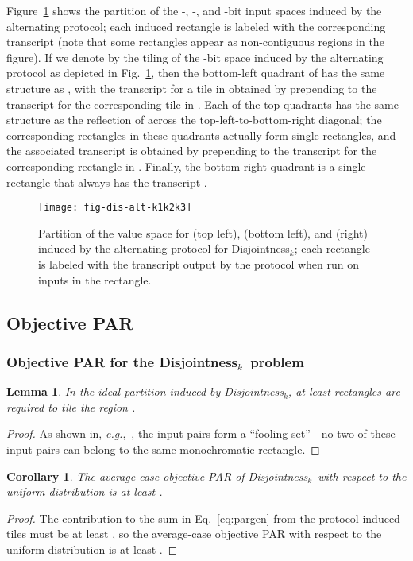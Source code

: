 \documentclass{article}
\theoremstyle{theorem}
\newtheorem{cor}[theorem]{Corollary}
\newtheorem{lemma}[theorem]{Lemma}
\theoremstyle{definition}
\theoremstyle{remark}
\newcommand{\eg}{\emph{e.g.}}
\newcommand{\disjoint}{{\sc Dis\-joint\-ness}\ensuremath{_k}}
\begin{document}
Figure~\ref{fig:dis-alt-k1k2k3} shows the partition of the -, -, and -bit input spaces induced by the alternating protocol; each induced rectangle is labeled with the corresponding transcript (note that some rectangles appear as non-contiguous regions in the figure).  If we denote by  the tiling of the -bit space induced by the alternating protocol as depicted in Fig.~\ref{fig:dis-alt-k1k2k3}, then the bottom-left quadrant of  has the same structure as , with the transcript for a tile in  obtained by prepending  to the transcript for the corresponding tile in .  Each of the top quadrants has the same structure as the reflection of  across the top-left-to-bottom-right diagonal; the corresponding rectangles in these quadrants actually form single rectangles, and the associated transcript is obtained by prepending  to the transcript for the corresponding rectangle in .  Finally, the bottom-right quadrant is a single rectangle that always has the transcript .
\begin{figure}[htp]
\begin{center}
\texttt{[image: fig-dis-alt-k1k2k3]}
\caption{Partition of the value space for  (top left),  (bottom left), and  (right) induced by the alternating protocol for \disjoint; each rectangle is labeled with the transcript output by the protocol when run on inputs in the rectangle.}\label{fig:dis-alt-k1k2k3}
\end{center}
\end{figure}


\subsection{Objective PAR}

\subsubsection{Objective PAR for the \disjoint\ problem}

\begin{lemma}
In the ideal partition induced by \disjoint, at least  rectangles are required to tile the region .
\end{lemma}
\begin{proof}
As shown in, \eg,~\cite{KN97}, the  input pairs  form a ``fooling set''---no two of these input pairs can belong to the same monochromatic rectangle.
\end{proof}

\begin{cor}\label{cor:dis-pardis}
The average-case objective PAR of \disjoint\ with respect to the uniform distribution is at least .
\end{cor}
\begin{proof}
The contribution to the sum in Eq.~\ref{eq:pargen} from the protocol-induced tiles  must be at least , so the average-case objective PAR with respect to the uniform distribution is at least .
\end{proof}
\end{document}
